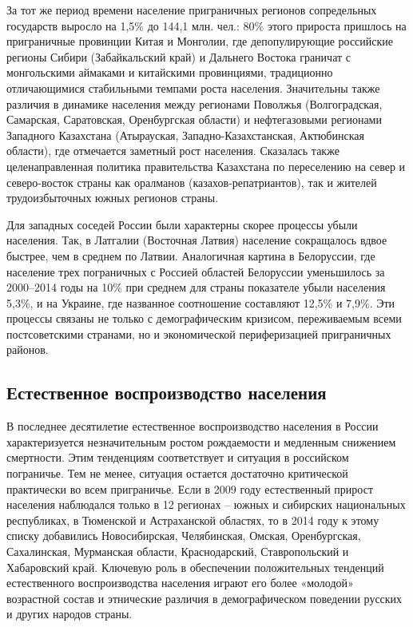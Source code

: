 \documentclass[]{book}
\begin{document}
За тот же период времени население приграничных регионов сопредельных
государств выросло на 1,5\% до 144,1 млн. чел.: 80\% этого прироста
пришлось на приграничные провинции Китая и Монголии, где депопулирующие
российские регионы Сибири (Забайкальский край) и Дальнего Востока
граничат с монгольскими аймаками и китайскими провинциями, традиционно
отличающимися стабильными темпами роста населения. Значительны также
различия в динамике населения между регионами Поволжья (Волгоградская,
Самарская, Саратовская, Оренбургская области) и нефтегазовыми регионами
Западного Казахстана (Атырауская, Западно-Казахстанская, Актюбинская
области), где отмечается заметный рост населения. Сказалась также
целенаправленная политика правительства Казахстана по переселению на
север и северо-восток страны как оралманов (казахов-репатриантов), так и
жителей трудоизбыточных южных регионов страны.

Для западных соседей России были характерны скорее процессы убыли
населения. Так, в Латгалии (Восточная Латвия) население сокращалось
вдвое быстрее, чем в среднем по Латвии. Аналогичная картина в
Белоруссии, где население трех пограничных с Россией областей Белоруссии
уменьшилось за 2000--2014 годы на 10\% при среднем для страны показателе
убыли населения 5,3\%, и на Украине, где названное соотношение
составляют 12,5\% и 7,9\%. Эти процессы связаны не только с
демографическим кризисом, переживаемым всеми постсоветскими странами, но
и экономической периферизацией приграничных районов.

\subsection{Естественное воспроизводство населения}\label{demo-situ-re}

В последнее десятилетие естественное воспроизводство населения в России
характеризуется незначительным ростом рождаемости и медленным снижением
смертности. Этим тенденциям соответствует и ситуация в российском
пограничье. Тем не менее, ситуация остается достаточно критической
практически во всем приграничье. Если в 2009 году естественный прирост
населения наблюдался только в 12 регионах -- южных и сибирских
национальных республиках, в Тюменской и Астраханской областях, то в 2014
году к этому списку добавились Новосибирская, Челябинская, Омская,
Оренбургская, Сахалинская, Мурманская области, Краснодарский,
Ставропольский и Хабаровский край. Ключевую роль в обеспечении
положительных тенденций естественного воспроизводства населения играют
его более «молодой» возрастной состав и этнические различия в
демографическом поведении русских и других народов страны.
\end{document}
